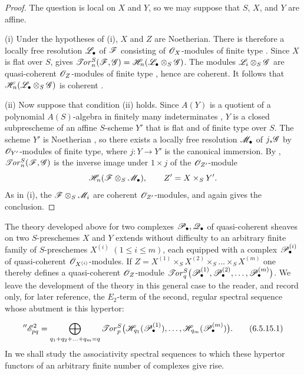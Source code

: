 \begin{proof}
The question is local on $X$ and $Y$, so we may suppose that
$S$, $X$, and $Y$ are affine.

\textnormal{(i)} Under the hypotheses of (i), $X$ and $Z$
are Noetherian.  There is therefore a locally free resolution
$\mathscr{L}_\bullet$ of $\mathscr{F}$ consisting of $\mathscr{O}_X$-modules of
finite type .  Since $X$ is flat over $S$,
 gives $\mathscr{T}\!\mathit{or}_n^S(\mathscr{F},\mathscr{G})
=
\mathscr{H}_n(\mathscr{L}_\bullet\otimes_S\mathscr{G})$.
The modules $\mathscr{L}_i\otimes_S\mathscr{G}$ are quasi-coherent
$\mathscr{O}_Z$-modules of finite type , hence are
coherent.  It follows that
$\mathscr{H}_n(\mathscr{L}_\bullet\otimes_S\mathscr{G})$ is coherent
.

\textnormal{(ii)} Now suppose that condition (ii) holds.  Since
$A(Y)$ is a quotient of a polynomial $A(S)$-algebra in finitely
many indeterminates , $Y$ is a closed
subprescheme of an affine $S$-scheme $Y'$ that is flat and of
finite type over $S$.  The scheme $Y'$ is Noetherian
, so there exists a locally free resolution
$\mathscr{M}_\bullet$ of $j_*\mathscr{G}$ by $\mathscr{O}_{Y'}$-modules of finite
type, where $j:Y\to Y'$ is the canonical immersion.  By
, $\mathscr{T}\!\mathit{or}_n^S(\mathscr{F},\mathscr{G})$ is the inverse image
under $1\times j$ of the $\mathscr{O}_{Z'}$-module
\[
  \mathscr{H}_n(\mathscr{F}\otimes_S\mathscr{M}_\bullet),
  \qquad Z'=X\times_SY'.
\]
As in (i), the $\mathscr{F}\otimes_S\mathscr{M}_i$ are coherent
$\mathscr{O}_{Z'}$-modules, and  again gives the
conclusion.
\end{proof}

\begin{env}[6.5.15]
\label{III.6.5.15}
The theory developed above for two complexes
$\mathscr{P}_\bullet,\mathscr{Q}_\bullet$ of quasi-coherent sheaves on two
$S$-preschemes $X$ and $Y$ extends without difficulty to an
arbitrary finite family of $S$-preschemes $X^{(i)}$
$(1\leq i\leq m)$, each equipped with a complex
$\mathscr{P}_\bullet^{(i)}$ of quasi-coherent
$\mathscr{O}_{X^{(i)}}$-modules.  If $Z=X^{(1)}\times_SX^{(2)}\times_S\ldots\times_SX^{(m)}$
one thereby defines a quasi-coherent $\mathscr{O}_Z$-module $\mathscr{T}\!\mathit{or}_q^S
\bigl(\mathscr{P}_\bullet^{(1)},\mathscr{P}_\bullet^{(2)},\ldots,
\mathscr{P}_\bullet^{(m)}\bigr)$.
We leave the development of the theory in this general case to
the reader, and record only, for later reference, the $E_2$-term
of the second, regular spectral sequence whose abutment is this
hypertor:


\[
  ''\mathscr{E}_{pq}^2
  =
  \bigoplus_{q_1+q_2+\ldots+q_m=q}
  \mathscr{T}\!\mathit{or}_p^S
  \bigl(
    \mathscr{H}_{q_1}(\mathscr{P}_\bullet^{(1)}),\ldots,
    \mathscr{H}_{q_m}(\mathscr{P}_\bullet^{(m)})
  \bigr).
  \tag{6.5.15.1}\label{III.6.5.15.1}
\]
In  we shall study the associativity spectral
sequences to which these hypertor functors of an arbitrary
finite number of complexes give rise.
\end{env}

